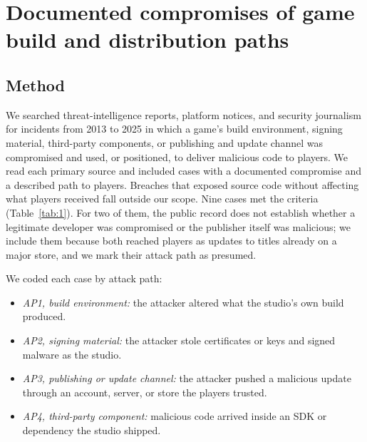 \documentclass[acmsmall,screen,review]{acmart}
\begin{document}
\section{Documented compromises of game build and distribution paths}\label{sec:3}


\subsection{Method}\label{sec:3.1}

We searched threat-intelligence reports, platform notices, and security journalism for incidents from 2013 to 2025 in which a game's build environment, signing material, third-party components, or publishing and update channel was compromised and used, or positioned, to deliver malicious code to players. We read each primary source and included cases with a documented compromise and a described path to players. Breaches that exposed source code without affecting what players received fall outside our scope. Nine cases met the criteria (Table~\ref{tab:1}). For two of them, the public record does not establish whether a legitimate developer was compromised or the publisher itself was malicious; we include them because both reached players as updates to titles already on a major store, and we mark their attack path as presumed.

We coded each case by attack path:

\begin{itemize}
\item \emph{AP1, build environment:} the attacker altered what the studio's own build produced.
\item \emph{AP2, signing material:} the attacker stole certificates or keys and signed malware as the studio.
\item \emph{AP3, publishing or update channel:} the attacker pushed a malicious update through an account, server, or store the players trusted.
\item \emph{AP4, third-party component:} malicious code arrived inside an SDK or dependency the studio shipped.
\end{itemize}
\end{document}
